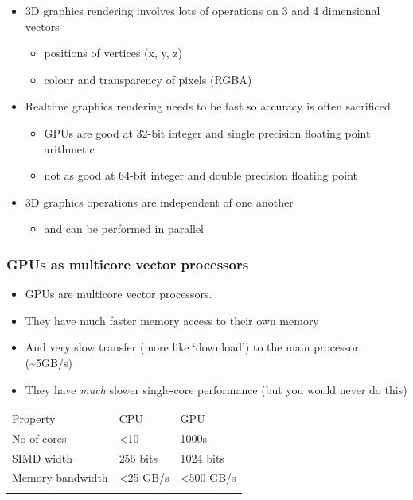 \begin{itemize}
\itemsep1pt\parskip0pt
\item
  3D graphics rendering involves lots of operations on 3 and 4
  dimensional vectors

  \begin{itemize}
  \itemsep1pt\parskip0pt
  \item
    positions of vertices (x, y, z)
  \item
    colour and transparency of pixels (RGBA)
  \end{itemize}
\item
  Realtime graphics rendering needs to be fast so accuracy is often
  sacrificed

  \begin{itemize}
  \itemsep1pt\parskip0pt
  \item
    GPUs are good at 32-bit integer and single precision floating point
    arithmetic
  \item
    not as good at 64-bit integer and double precision floating point
  \end{itemize}
\item
  3D graphics operations are independent of one another

  \begin{itemize}
  \itemsep1pt\parskip0pt
  \item
    and can be performed in parallel
  \end{itemize}
\end{itemize}

\subsubsection{GPUs as multicore vector
processors}\label{gpus-as-multicore-vector-processors}

\begin{itemize}
\itemsep1pt\parskip0pt
\item
  GPUs are multicore vector processors.
\item
  They have much faster memory access to their own memory
\item
  And very slow transfer (more like `download') to the main processor
  (\textasciitilde{}5GB/s)
\item
  They have \emph{much} slower single-core performance (but you would
  never do this)
\end{itemize}

\begin{longtable}[c]{@{}lll@{}}
\toprule\addlinespace
Property & CPU & GPU
\\\addlinespace
\midrule\endhead
No of cores & \textless{}10 & 1000s
\\\addlinespace
SIMD width & 256 bits & 1024 bits
\\\addlinespace
Memory bandwidth & \textless{}25 GB/s & \textless{}500 GB/s
\\\addlinespace
\bottomrule
\end{longtable}

